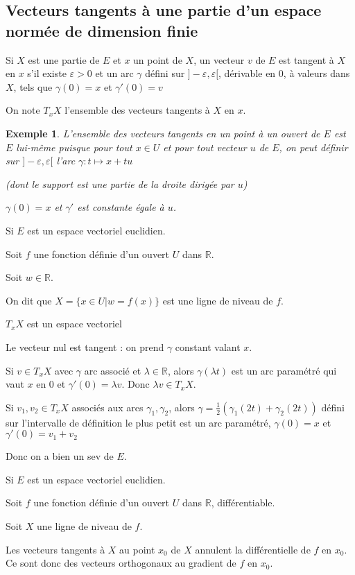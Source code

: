 \documentclass[a4paper,12pt]{book}
\newcommand{\Def}[2]{\begin{tcolorbox}[sharp corners, colback=white,colframe=blue!90!black!75, title=Définition : #1]#2\end{tcolorbox}}
\newcommand{\Prop}[2]{\begin{tcolorbox}[sharp corners, colback=white,colframe=red!90!black!75, title=Proposition : #1]#2\end{tcolorbox}}
\newcommand{\Pre}[1]{\begin{tcolorbox}[sharp corners, colback=white,colframe=green!60!green!30!black!75, title=Preuve]#1\end{tcolorbox}}
\newtheorem{Exe}{Exemple}[section]
\def\R{\mathbb{R}}
\begin{document}
\subsection{Vecteurs tangents à une partie d'un espace normée de dimension finie}
\Def{}{Si $X$ est une partie de $E$ et $x$ un point de $X$, un vecteur $v$ de $E$ est tangent à $X$ en $x$ s'il existe $\varepsilon>0$ et un arc $\gamma$ défini sur $]-\varepsilon, \varepsilon[$, dérivable en $0$, à valeurs dans $X$, tels que $\gamma(0)=x$ et $\gamma'(0)=v$
\par On note $T_xX$ l'ensemble des vecteurs tangents à $X$ en $x$.}
\begin{Exe}
L'ensemble des vecteurs tangents en un point à un ouvert de $E$ est $E$ lui-même puisque pour tout $x\in U$ et pour tout vecteur $u$ de $E$, on peut définir sur $]-\varepsilon, \varepsilon[$ l'arc $\gamma:t\mapsto x+tu$
\par (dont le support est une partie de la droite dirigée par $u$)
\par $\gamma(0)=x$ et $\gamma'$ est constante égale à $u$.
\end{Exe}
\Def{}{Si $E$ est un espace vectoriel euclidien.
\par Soit $f$ une fonction définie d'un ouvert $U$ dans $\R$.
\par Soit $w\in\R$.
\par On dit que $X = \{x\in U\vert w= f(x)\}$ est une ligne de niveau de $f$.}
\Prop{}{$T_xX$ est un espace vectoriel}
\Pre{Le vecteur nul est tangent : on prend $\gamma$ constant valant $x$.
\par Si $v\in T_xX$ avec $\gamma$ arc associé et $\lambda\in\R$, alors $\gamma(\lambda t)$ est un arc paramétré qui vaut $x$ en $0$ et $\gamma'(0) =\lambda v$. Donc $\lambda v\in T_xX$.
\par Si $v_1, v_2\in T_xX$ associés aux arcs $\gamma_1,\gamma_2$, alors $\gamma =\frac{1}{2}(\gamma_1(2t)+\gamma_2(2t))$ défini sur l'intervalle de définition le plus petit est un arc paramétré, $\gamma(0)=x$ et $\gamma'(0)=v_1+v_2$ 
\par Donc on a bien un sev de $E$.}
\Prop{}{Si $E$ est un espace vectoriel euclidien.
\par Soit $f$ une fonction définie d'un ouvert $U$ dans $\R$, différentiable.
\par Soit $X$ une ligne de niveau de $f$.
\par Les vecteurs tangents à $X$ au point $x_0$ de $X$ annulent la différentielle de $f$ en $x_0$.
Ce sont donc des vecteurs orthogonaux au gradient de $f$ en $x_0$.}
\end{document}
